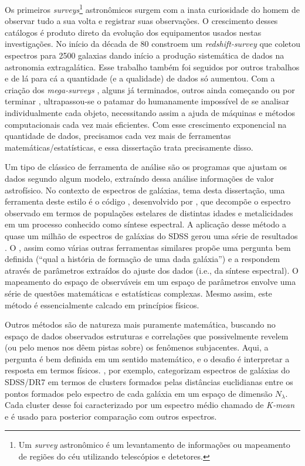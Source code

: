 Os primeiros {\em surveys}\footnote{Um {\em survey} astronômico é um levantamento de informações ou mapeamento de
regiões do céu utilizando telescópios e detetores.} astronômicos surgem com a inata curiosidade do homem de observar
tudo a sua volta e registrar suas observações. O crescimento desses catálogos é produto direto da evolução dos
equipamentos usados nestas investigações. No início da década de 80 \citet{Huchra1983} constroem um {\em
redshift-survey} que coletou espectros para 2500 galaxias dando início a produção sistemática de dados na astronomia
extragalática. Esse trabalho também foi seguidos por outros trabalhos \citep[e.g., ][]{Huchra1988, DaCosta1988} e de lá
para cá a quantidade (e a qualidade) de dados só aumentou. Com a criação dos {\em mega-surveys} \citep[\SDSS;
][]{York2000} \citep[2dFGRS;][]{Colless1999} \citep[2MASS;][]{Skrutskie2006}, alguns já terminados, outros ainda
começando ou por terminar \citep[LSST; ][]{Ivezic2008} \citep[J-PAS;][]{Benitez2009}, ultrapassou-se o patamar do
humanamente impossível de se analisar individualmente cada objeto, necessitando assim a ajuda de máquinas e métodos
computacionais cada vez mais eficientes. Com esse crescimento exponencial na quantidade de dados, precisamos cada vez
mais de ferramentas matemáticas/estatísticas, e essa dissertação trata precisamente disso.

Um tipo de clássico de ferramenta de análise são os programas que ajustam os dados segundo algum modelo, extraíndo dessa
análise informações de valor astrofísico. No contexto de espectros de galáxias, tema desta dissertação, uma ferramenta
deste estilo é o código \starlight, desenvolvido por \citet{CidFernandes2005}, que decompõe o espectro observado em
termos de populações estelares de distintas idades e metalicidades em um processo conhecido como síntese espectral.
A aplicação desse método a quase um milhão de espectros de galáxias do SDSS gerou uma série de resultados \citep[e.g.,
][]{Asari2007, Asari2009, CidFernandes2007, Mateus2007}. O \starlight, assim como várias outras ferramentas similares
\citep{Panter2003, Gallazzi2005, Ocvirk2006} propõe uma pergunta bem definida (``qual a história de formação de
uma dada galáxia'') e a respondem através de parâmetros extraídos do ajuste dos dados (i.e., da síntese espectral). O
mapeamento do espaço de observáveis em um espaço de parâmetros envolve uma série de questões matemáticas e estatísticas
complexas. Mesmo assim, este método é essencialmente calcado em princípios físicos.

Outros métodos são de natureza mais puramente matemática, buscando no espaço de dados observados estruturas e
correlações que possivelmente revelem (ou pelo menos nos dêem pistas sobre) os fenômenos subjacentes. Aqui, a pergunta é
bem definida em um sentido matemático, e o desafio é interpretar a resposta em termos físicos.
\citet{SanchezAlmeida2010}, por exemplo, categorizam espectros de galáxias do SDSS/DR7 em termos de clusters formados
pelas distâncias euclidianas entre os pontos formados pelo espectro de cada galáxia em um espaço de dimensão
$N_\lambda$. Cada cluster desse foi caracterizado por um espectro médio chamado de {\em K-mean} e é usado para posterior
comparação com outros espectros. 

